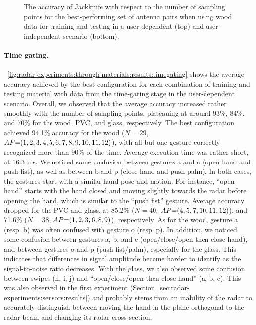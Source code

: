 \begin{figure}[!t]
    \vspace{-6pt}
    \caption{The accuracy of Jackknife with respect to the number of sampling points for the best-performing set of antenna pairs when using wood data for training and testing in a user-dependent (top) and user-independent scenario (bottom).}
    \label{fig:radar-experiments:through-materials:wood-samples}
\end{figure}

\paragraph{Time gating.}

\fig~\ref{fig:radar-experiments:through-materials:results:timegating} shows the average accuracy achieved by the best configuration for each combination of training and testing material with data from the time-gating stage in the user-dependent scenario.
%
Overall, we observed that the average accuracy increased rather smoothly with the number of sampling points, plateauing at around 93\%, 84\%, and 70\% for the wood, PVC, and glass, respectively.
The best configuration achieved 94.1\% accuracy for the wood ($N{=}29$, $\splitatcommas{AP{=}(1, 2, 3, 4, 5, 6, 7, 8, 9, 10, 11, 12)}$), with all but one gesture correctly recognized more than 90\% of the time. Average execution time was rather short, at 16.3 ms.
%
We noticed some confusion between gestures a and o (open hand and push fist), as well as between b and p (close hand and push palm). In both cases, the gestures start with a similar hand pose and motion. For instance, ``open hand'' starts with the hand closed and moving slightly towards the radar before opening the hand, which is similar to the ``push fist'' gesture.
Average accuracy dropped for the PVC and glass, at 85.2\% ($N{=}40$, $\splitatcommas{AP{=}(4, 5, 7, 10, 11, 12)}$), and 71.6\% ($N{=}38$, $\splitatcommas{AP{=}(1, 2, 3, 6, 8, 9)}$), respectively.
%
As for the wood, gesture a (resp. b) was often confused with gesture o (resp. p).
%
In addition, we noticed some confusion between gestures a, b, and c (open/close/open then close hand), and between gestures o and p (push fist/palm), especially for the glass. This indicates that differences in signal amplitude become harder to identify as the signal-to-noise ratio decreases.
%
With the glass, we also observed some confusion between swipes (h, i, j) and ``open/close/open then close hand'' (a, b, c). This was also observed in the first experiment (Section~\ref{sec:radar-experiments:sensors:results}) and probably stems from an inability of the radar to accurately distinguish between moving the hand in the plane orthogonal to the radar beam and changing its radar cross-section.

